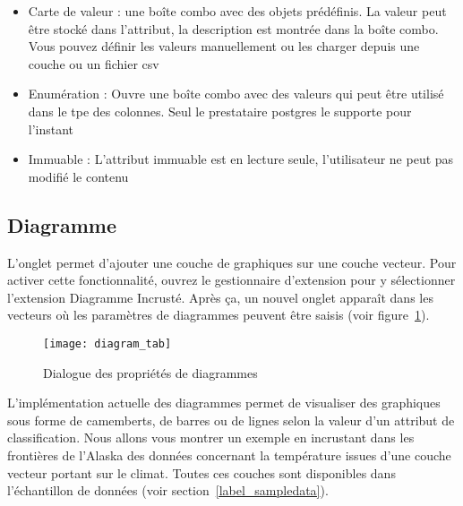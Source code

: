 \begin{itemize}[label=--]
\item Carte de valeur : une boîte combo avec des objets prédéfinis. La valeur peut être stocké dans l'attribut, la description est montrée dans la boîte combo. Vous pouvez définir les valeurs manuellement ou les charger depuis une couche ou un fichier csv
\item Enumération : Ouvre une boîte combo avec des valeurs qui peut être utilisé dans le tpe des colonnes. Seul le prestataire postgres le supporte pour l'instant
\item Immuable : L'attribut immuable est en lecture seule, l'utilisateur ne peut pas modifié le contenu
\end{itemize}

\subsection{Diagramme}\label{sec:diagram}
L'onglet  permet d'ajouter une couche de graphiques sur une couche vecteur. Pour activer cette fonctionnalité, ouvrez le gestionnaire d'extension pour y sélectionner l'extension Diagramme Incrusté. Après ça, un nouvel onglet apparaît dans les  vecteurs où les paramètres de diagrammes peuvent être saisis (voir figure~\ref{fig:diagramtab}).

\begin{figure}[ht]
   \begin{center}
   \texttt{[image: diagram\_tab]}
   \caption{Dialogue des propriétés de diagrammes \nixcaption}\label{fig:diagramtab}
\end{center}
\end{figure}

L'implémentation actuelle des diagrammes permet de visualiser des graphiques sous forme de camemberts, de barres ou de lignes selon la valeur d'un attribut de classification. Nous allons vous montrer un exemple en incrustant dans les frontières de l'Alaska des données concernant la température issues d'une couche vecteur portant sur le climat. Toutes ces couches sont disponibles dans l'échantillon de données \qg (voir section~\ref{label_sampledata}).

